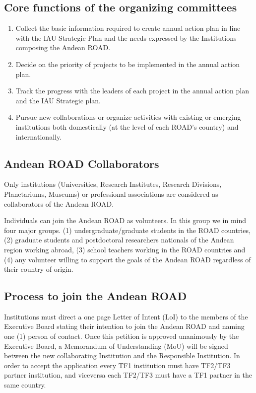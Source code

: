 \documentclass[12pt]{article}
\begin{document}
\subsection*{Core functions of the organizing committees}
\begin{enumerate}
\item Collect the basic information required to create annual action
  plan in line with the IAU Strategic Plan and the needs expressed by
  the Institutions composing the Andean ROAD. 
\item Decide on the priority of projects to be implemented in the
  annual action plan. 
\item Track the progress with the leaders of each project in the
  annual action plan and the IAU Strategic plan. 
\item Pursue new collaborations or organize activities with existing
  or emerging institutions both domestically (at the level of each
  ROAD’s country) and internationally. 
 \end{enumerate}

\subsection*{Andean ROAD Collaborators}


Only institutions (Universities, Research Institutes, Research
Divisions, Planetariums, Museums) or professional associations are
considered as collaborators of the Andean ROAD. 

Individuals can join the Andean ROAD as volunteers. In this group we
in mind four major groups. (1) undergraduate/graduate students in the
ROAD countries, (2) graduate students and postdoctoral researchers
nationals of the Andean region working abroad, (3) school teachers
working in the ROAD countries and (4) any volunteer willing to support
the goals of the Andean ROAD regardless of their country of origin. 


\subsection*{Process to join the Andean ROAD}

Institutions must direct a one page Letter of Intent (LoI) to the
members of the Executive Board stating their intention to join the
Andean ROAD and naming one (1) person of contact. Once this petition
is approved unanimously by the Executive Board, a Memorandum of
Understanding (MoU) will be signed between the new collaborating Institution
and the Responsible Institution. In order to accept the application
every TF1 institution must have TF2/TF3 partner institution,
and viceversa each TF2/TF3 must have a TF1 partner in the same
country. 
\end{document}
